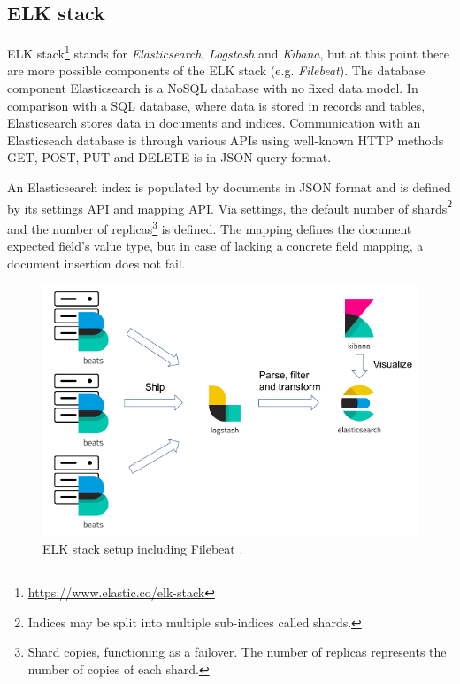 \documentclass[12pt,a4paper,twoside]{book}
\begin{document}
        \subsection{ELK stack} \label{analysis:storage:elastic}
            ELK stack\footnote{\url{https://www.elastic.co/elk-stack}} stands for \emph{Elasticsearch}, \emph{Logstash} and \emph{Kibana}, but at this point there are more possible components of the ELK stack (e.g. \emph{Filebeat}). The database component Elasticsearch is a NoSQL database with no fixed data model. In comparison with a SQL database, where data is stored in records and tables, Elasticsearch stores data in documents and indices. Communication with an Elasticseach database is through various APIs using well-known HTTP methods GET, POST, PUT and DELETE is in JSON query format.\par
            An Elasticsearch index is populated by documents in JSON format and is defined by its settings API and mapping API. Via settings, the default number of shards\footnote{Indices may be split into multiple sub-indices called shards.} and the number of replicas\footnote{Shard copies, functioning as a failover. The number of replicas represents the number of copies of each shard.} \cite{docs:elastic:terms} is defined. The mapping defines the document expected field's value type, but in case of lacking a concrete field mapping, a document insertion does not fail.\par
            \begin{figure}
                \centering
                \includegraphics[scale=0.5]{logstash-filebeat}
                \caption{ELK stack setup including Filebeat \cite{image:elk}.}
                \label{figure:storage:elk}
            \end{figure}
\end{document}
